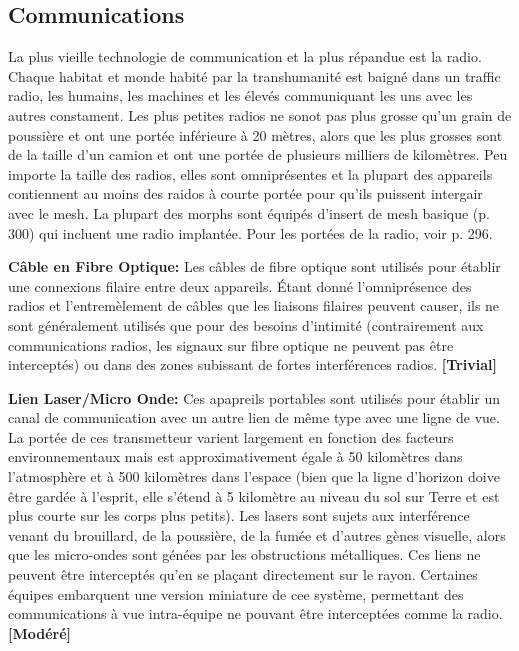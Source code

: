 {{\subsection{Communications} \label{sec:communications} 

La plus vieille technologie de communication et la plus répandue est la radio. Chaque habitat et monde habité par la transhumanité est baigné dans un traffic radio, les humains, les machines et les élevés communiquant les uns avec les autres constament. Les plus petites radios ne sonot pas plus grosse qu'un grain de poussière et ont une portée inférieure à 20 mètres, alors que les plus grosses sont de la taille d'un camion et ont une portée de plusieurs milliers de kilomètres. Peu importe la taille des radios, elles sont omniprésentes et la plupart des appareils contiennent au moins des raidos à courte portée pour qu'ils puissent intergair avec le mesh. La plupart des morphs sont équipés d'insert de mesh basique (p. 300) qui incluent une radio implantée. Pour les portées de la radio, voir p. 296. 

\textbf{Câble en Fibre Optique:} Les câbles de fibre optique sont utilisés pour établir une connexions filaire entre deux appareils. Étant donné l'omniprésence des radios et l'entremèlement de câbles que les liaisons filaires peuvent causer, ils ne sont généralement utilisés que pour des besoins d'intimité (contrairement aux communications radios, les signaux sur fibre optique ne peuvent pas être interceptés) ou dans des zones subissant de fortes interférences radios. \textbf{[Trivial]} 

\textbf{Lien Laser/Micro Onde:} Ces apapreils portables sont utilisés pour établir un canal de communication avec un autre lien de même type avec une ligne de vue. La portée de ces transmetteur varient largement en fonction des facteurs environnementaux mais est approximativement égale à 50 kilomètres dans l'atmosphère et à 500 kilomètres dans l'espace (bien que la ligne d'horizon doive être gardée à l'esprit, elle s'étend à 5 kilomètre au niveau du sol sur Terre et est plus courte sur les corps plus petits). Les lasers sont sujets aux interférence venant du brouillard, de la poussière, de la fumée et d'autres gènes visuelle, alors que les micro-ondes sont génées par les obstructions métalliques. Ces liens ne peuvent être interceptés qu'en se plaçant directement sur le rayon. Certaines équipes embarquent une version miniature de cee système, permettant des communications à vue intra-équipe ne pouvant être interceptées comme la radio. \textbf{[Modéré]} 

}}
